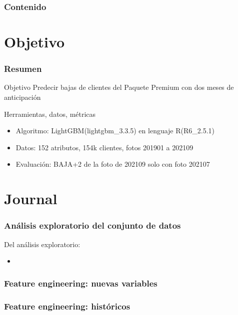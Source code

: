 \documentclass[aspectratio=43]{beamer}
\begin{document}
\begin{frame}
	\frametitle{Contenido}
	\tableofcontents
\end{frame}

\section{Objetivo}

\begin{frame}
	\frametitle{Resumen}
	\begin{block}{Objetivo}
		Predecir bajas de clientes del Paquete Premium con dos meses de anticipación 
	\end{block}
	\begin{block}{Herramientas, datos, métricas}
		\begin{itemize}
			\item Algoritmo: LightGBM(lightgbm\_3.3.5) en lenguaje R(R6\_2.5.1)
			\item Datos: 152 atributos, 154k clientes, fotos 201901 a 202109%
			\item Evaluación: BAJA+2 de la foto de 202109 solo con foto 202107
		\end{itemize}
	\end{block}
\end{frame}


\section{Journal}

\begin{frame}
	\frametitle{Análisis exploratorio del conjunto de datos}
	Del análisis exploratorio:
	\begin{itemize}
		\item 
	\end{itemize}
\end{frame}


\begin{frame}
	\frametitle{Feature engineering: nuevas variables}
	

\end{frame}


\begin{frame}
	\frametitle{Feature engineering: históricos}
	

\end{frame}
\end{document}
